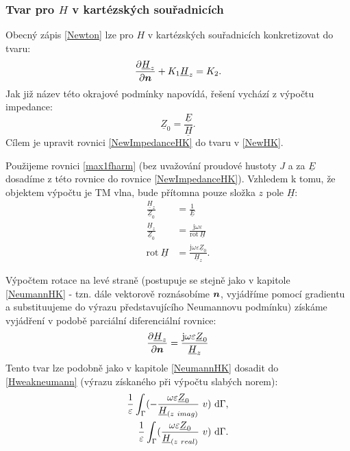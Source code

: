 \documentclass[12pt,a4paper,oneside]{article}
\numberwithin{equation}{section} %
\numberwithin{figure}{section} %
\numberwithin{table}{section} %
\newcommand{\mj}{\mathrm{j}} %
\renewcommand{\vec}[1]{\mbox{\boldmath$#1$}} %
\newcommand{\faz}[1]{{\underline{#1}}} %
\newcommand{\rot}{\mathrm{rot}\ }
\begin{document}
\subsubsection*{Tvar pro \faz{\vec{H}} v kartézských souřadnicích}
Obecný zápis \ref{Newton} lze pro \faz{\vec{H}} v kartézských souřadnicích konkretizovat do tvaru:
\begin{equation}
\label{NewHK}
\frac{\partial \faz{H} _z}{\partial \vec{n}} + K_1 \faz{H} _z = K_2 .
\end{equation}
Jak již název této okrajové podmínky napovídá, řešení vychází z výpočtu impedance: 
\begin{equation}
\label{NewImpedanceHK}
\faz{Z} _0 = \frac{\faz{E}}{\faz{H}} .
\end{equation}
Cílem je upravit rovnici \ref{NewImpedanceHK} do tvaru v \ref{NewHK}.

Použijeme rovnici \ref{max1fharm} (bez uvažování proudové hustoty $J$ a za $\faz{E}$ dosadíme z této rovnice do rovnice \ref{NewImpedanceHK}). Vzhledem k tomu, že objektem výpočtu je TM vlna, bude přítomna pouze složka $z$ pole $\faz{H}$:
\begin{subequations}
\begin{align}
\frac{\faz{H} _z}{\faz{Z} _0} &= \frac{1}{\faz{E}}
\\
\frac{\faz{H} _z}{\faz{Z} _0} &= \frac{\mj \omega \varepsilon}{\rot \! \faz{H}}
\\
\rot \! \faz{H} &= \frac{\mj \omega \varepsilon \faz{Z} _0}{\faz{H} _z} .
\end{align}
\end{subequations}

Výpočtem rotace na levé straně (postupuje se stejně jako v kapitole \ref{NeumannHK} - tzn. dále vektorově roznásobíme $\vec{n}$, vyjádříme pomocí gradientu a substituujeme do výrazu představujícího Neumannovu podmínku) získáme vyjádření v podobě parciální diferenciální rovnice:
\begin{equation}
\frac{\partial \faz{H} _z}{\partial \vec{n}} = \frac{\mj \omega \varepsilon \faz{Z} _0}{\faz{H} _z}
\end{equation}
Tento tvar lze podobně jako v kapitole \ref{NeumannHK} dosadit do \ref{Hweakneumann} (výrazu získaného při výpočtu slabých norem):
\begin{subequations}
\begin{align}
\frac{1}{\varepsilon} \int _{\Gamma} ( - \frac{\omega \varepsilon \faz{Z} _0}{\faz{H} _{(z~imag)}} ~ v ) ~ \ud \Gamma ,
\\ 
\frac{1}{\varepsilon} \int _{\Gamma} ( \frac{\omega \varepsilon \faz{Z} _0}{\faz{H} _{(z~real)}} ~ v ) ~ \ud \Gamma .
\end{align}
\end{subequations}
\end{document}
